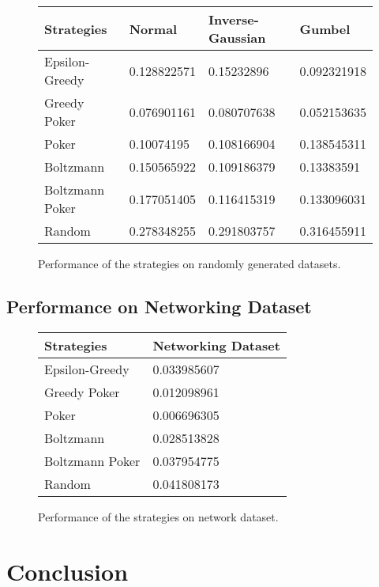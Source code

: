 \documentclass[12pt]{article}
\begin{document}
\begin{figure}
\begin{center}
    \begin{tabular}{| l | l | l | l |}
    \hline
    Strategies & Normal & Inverse-Gaussian & Gumbel \\ \hline
    Epsilon-Greedy & 0.128822571 & 0.15232896 & 0.092321918 \\ \hline
    Greedy Poker & 0.076901161 & 0.080707638 & 0.052153635 \\ \hline
    Poker & 0.10074195 & 0.108166904 & 0.138545311 \\ \hline
    Boltzmann & 0.150565922 & 0.109186379 & 0.13383591 \\ \hline
    Boltzmann Poker & 0.177051405 & 0.116415319 & 0.133096031 \\ \hline 
    Random & 0.278348255 & 0.291803757 & 0.316455911 \\ \hline
    \hline
    \end{tabular}
\end{center}  
\caption{Performance of the strategies on randomly generated datasets.}
\end{figure}

\subsection{Performance on Networking Dataset}

\begin{figure}
\begin{center}
    \begin{tabular}{| l | l |}
    \hline
    Strategies & Networking Dataset \\ \hline
    Epsilon-Greedy & 0.033985607\\ \hline
    Greedy Poker & 0.012098961 \\ \hline
    Poker & 0.006696305 \\ \hline
    Boltzmann & 0.028513828 \\ \hline
    Boltzmann Poker & 0.037954775 \\ \hline 
    Random & 0.041808173 \\ \hline
    \hline
    \end{tabular}
\end{center}  
\caption{Performance of the strategies on network dataset.}
\end{figure}

\section{Conclusion}
\end{document}
